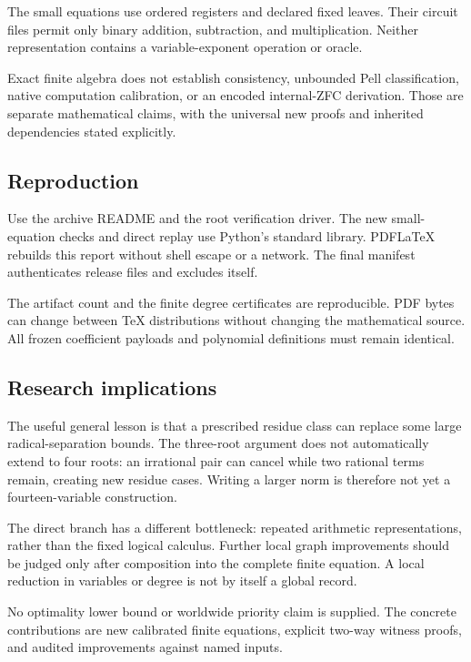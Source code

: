\documentclass[11pt,letterpaper]{article}
\theoremstyle{remark}\newtheorem{remark}[theorem]{Remark}
\begin{document}
The small equations use ordered registers and declared fixed leaves.
Their circuit files permit only binary addition, subtraction, and
multiplication. Neither representation contains a variable-exponent
operation or oracle.

Exact finite algebra does not establish consistency, unbounded Pell
classification, native computation calibration, or an encoded internal-ZFC
derivation. Those are separate mathematical claims, with the universal
new proofs and inherited dependencies stated explicitly.

\subsection{Reproduction}
Use the archive README and the root verification driver.
The new small-equation checks and direct replay use Python's standard
library. PDFLaTeX rebuilds this report without shell escape or a network.
The final manifest authenticates release files and excludes itself.

The artifact count and the finite degree certificates are reproducible.
PDF bytes can change between TeX distributions without changing the
mathematical source. All frozen coefficient payloads and polynomial
definitions must remain identical.

\subsection{Research implications}
The useful general lesson is that a prescribed residue class can replace
some large radical-separation bounds. The three-root argument does not
automatically extend to four roots: an irrational pair can cancel while
two rational terms remain, creating new residue cases. Writing a larger norm is therefore
not yet a fourteen-variable construction.

The direct branch has a different bottleneck: repeated arithmetic
representations, rather than the fixed logical calculus. Further local
graph improvements should be judged only after composition into the
complete finite equation. A local reduction in variables or degree is not
by itself a global record.

No optimality lower bound or worldwide priority claim is supplied.
The concrete contributions are new calibrated finite equations, explicit
two-way witness proofs, and audited improvements against named inputs.

\appendix
\end{document}
